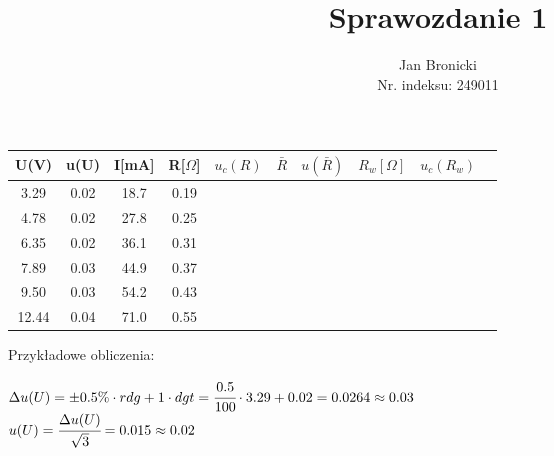 \documentclass{article}
\title{Sprawozdanie 1}
\author{Jan Bronicki\\
Nr. indeksu: 249011}
\date{}
\begin{document}
\maketitle



\begin{center}
    \renewcommand{\arraystretch}{1.2}
\begin{tabular}{ |c|c|c|c|c|c|c|c|c|c| }
    \hline
    U(V)&u(U)&I[mA]&R[$\Omega$]&$u_c(R)$&$\bar{R}$&$u(\bar{R})$&$R_w[\Omega]$&$u_c(R_w)$ \\
    \hline \hline
    3.29&0.02&18.7&0.19&&&&&\\ 
    \hline
    4.78&0.02&27.8&0.25&&&&&\\ 
    \hline
    6.35&0.02&36.1&0.31&&&&&\\ 
    \hline
    7.89&0.03&44.9&0.37&&&&&\\ 
    \hline
    9.50&0.03&54.2&0.43&&&&&\\ 
    \hline
    12.44&0.04&71.0&0.55&&&&&\\ 
    \hline
\end{tabular}
\end{center}
Przykładowe obliczenia:
\begin{center}
    $\Delta u(U)  = \pm0.5\% \cdot rdg+1 \cdot dgt=\cfrac{0.5}{100} \cdot 3.29 + 0.02=0.0264\approx0.03$\\
    $u(U)=\cfrac{\Delta u(U)}{\sqrt{3}}=0.015\approx0.02$
\end{center}
\end{document}
